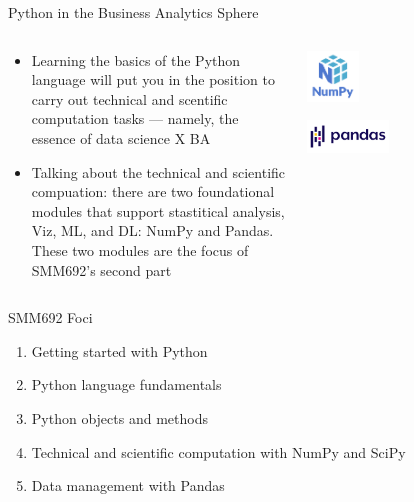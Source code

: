 \documentclass[aspectratio=1610]{beamer}
\begin{document}
\begin{frame}[c]{Python in the Business Analytics Sphere}

	\begin{columns}[c]
		\begin{column}{0.5\textwidth}

			\begin{itemize}
				\item Learning the basics of the Python language will put you in the position to carry out technical and scentific computation tasks --- namely, the essence of data science X BA
				\item Talking about the technical and scientific compuation: there are two foundational modules that support stastitical analysis, Viz, ML, and DL: NumPy and Pandas. These two modules are the focus of SMM692's second part
			\end{itemize}
		\end{column}
		\begin{column}{0.5\textwidth}
			\centering
			\includegraphics[width=0.25\textwidth]{images/numpy.png}

			\includegraphics[width=0.4\textwidth]{images/pandas.png}
		\end{column}
	\end{columns}
\end{frame}

\begin{frame}{SMM692 Foci}
	\begin{enumerate}
		\item Getting started with Python
		\item Python language fundamentals
		\item Python objects and methods
		\item Technical and scientific computation with NumPy and SciPy
		\item Data management with Pandas
	\end{enumerate}
\end{frame}
\end{document}
